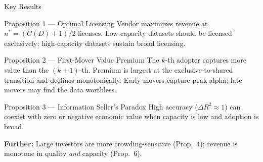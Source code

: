 \documentclass[12pt, aspectratio=169]{beamer}
\begin{document}
\begin{frame}{Key Results}

\footnotesize

\begin{block}{Proposition 1 \;---\; Optimal Licensing}
Vendor maximizes revenue at $n^* = (C(D)+1)/2$ licenses.
Low-capacity datasets should be licensed exclusively;
high-capacity datasets sustain broad licensing.
\end{block}

\begin{block}{Proposition 2 \;---\; First-Mover Value Premium}
The $k$-th adopter captures more value than the $(k+1)$-th.
Premium is largest at the exclusive-to-shared transition and declines
monotonically. Early movers capture peak alpha; late movers may find
the data worthless.
\end{block}

\begin{block}{Proposition 3 \;---\; Information Seller's Paradox}
High accuracy ($\Delta R^2 \approx 1$) can coexist with zero or negative
economic value when capacity is low and adoption is broad.
\end{block}

\vspace{1pt}
\textbf{Further:} Large investors are more crowding-sensitive (Prop.\ 4);
revenue is monotone in quality \emph{and} capacity (Prop.\ 6).

\end{frame}
\end{document}
